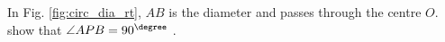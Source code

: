 %
%		

%
%
%
%		

%

%
\iffalse
\item
In Fig. \ref{fig:circ_dia_rt}, $AB$ is the diameter and passes through the centre $O$.  show that $\angle APB = 90^{\degree}$ .

